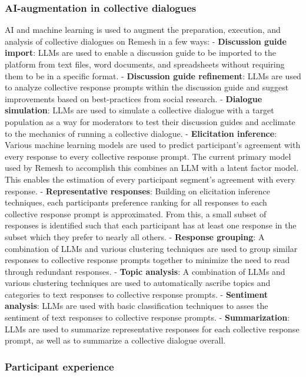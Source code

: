 \documentclass{article}
\begin{document}
\subsubsection{AI-augmentation in collective dialogues}
AI and machine learning is used to augment the preparation, execution, and analysis of collective dialogues on Remesh in a few ways:
-  \textbf{Discussion guide import}: LLMs are used to enable a discussion guide to be imported to the platform from text files, word documents, and spreadsheets without requiring them to be in a specific format.
-  \textbf{Discussion guide refinement}: LLMs are used to analyze collective response prompts within the discussion guide and suggest improvements based on best-practices from social research.
-  \textbf{Dialogue simulation}: LLMs are used to simulate a collective dialogue with a target population as a way for moderators to test their discussion guides and acclimate to the mechanics of running a collective dialogue.
-  \textbf{Elicitation inference}: Various machine learning models are used to predict participant's agreement with every response to every collective response prompt. The current primary model used by Remesh to accomplish this combines an LLM with a latent factor model. This enables the estimation of every participant segment's agreement with every response.
-  \textbf{Representative responses}: Building on elicitation inference techniques, each participants preference ranking for all responses to each collective response prompt is approximated. From this, a small subset of responses is identified such that each participant has at least one response in the subset which they prefer to nearly all others.
-  \textbf{Response grouping}: A combination of LLMs and various clustering techniques are used to group similar responses to collective response prompts together to minimize the need to read through redundant responses.
-  \textbf{Topic analysis}: A combination of LLMs and various clustering techniques are used to automatically ascribe topics and categories to text responses to collective response prompts.
-  \textbf{Sentiment analysis}: LLMs are used with basic classification techniques to asses the sentiment of text responses to collective response prompts.
-  \textbf{Summarization}: LLMs are used to summarize representative responses for each collective response prompt, as well as to summarize a collective dialogue overall.

\subsubsection{Participant experience}
\end{document}
